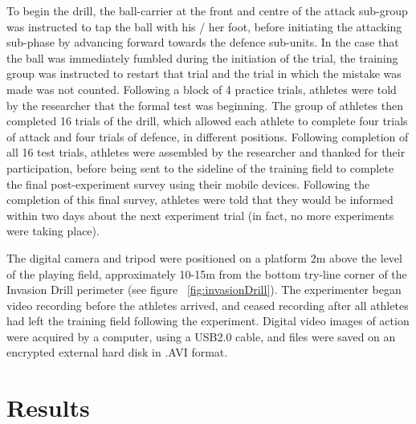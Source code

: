 To begin the drill, the ball-carrier at the front and centre of the attack sub-group was instructed to tap the ball with his / her foot, before initiating the attacking sub-phase by advancing forward towards the defence sub-units.  In the case that the ball was immediately fumbled during the initiation of the trial, the training group was instructed to restart that trial and the trial in which the mistake was made was not counted.  Following a block of 4 practice trials, athletes were told by the researcher that the formal test was beginning.  The group of athletes then completed 16 trials of the drill, which allowed each athlete to complete four trials of attack and four trials of defence, in different positions.  Following completion of all 16 test trials, athletes were assembled by the researcher and thanked for their participation, before being sent to the sideline of the training field to complete the final post-experiment survey using their mobile devices.  Following the completion of this final survey, athletes were told that they would be informed within two days about the next experiment trial (in fact, no more experiments were taking place).

The digital camera and tripod were positioned on a platform 2m above the level of the playing field, approximately 10-15m from the bottom try-line corner of the Invasion Drill perimeter (see figure ~\ref{fig:invasionDrill}).  The experimenter began video recording before the athletes arrived, and ceased recording after all athletes had left the training field following the experiment.  Digital video images of action were acquired by a computer, using a USB2.0 cable, and files were saved on an encrypted external hard disk in .AVI format.



\section{Results}




